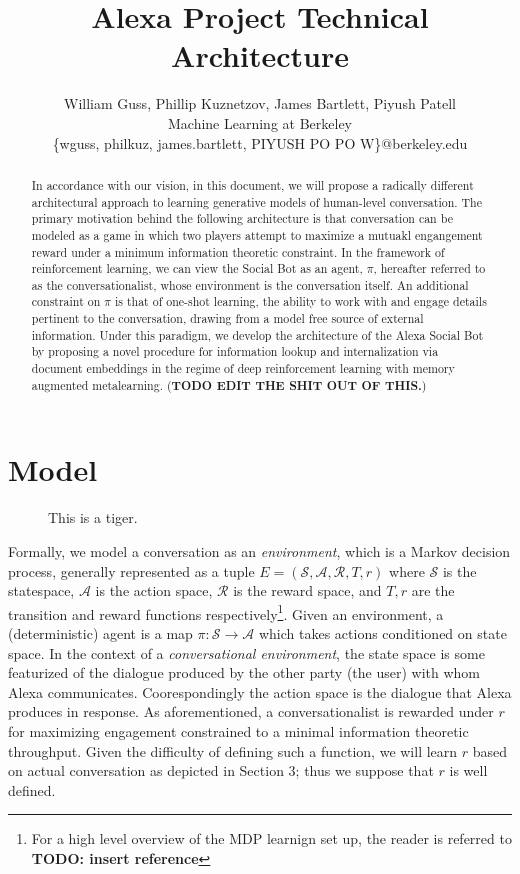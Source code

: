\documentclass{article} %
\title{Alexa Project Technical Architecture}
\author{William Guss, Phillip Kuznetzov, James Bartlett, Piyush Patell\\
Machine Learning at Berkeley\\
\{wguss, philkuz, james.bartlett, PIYUSH PO PO W\}@berkeley.edu}
\numberwithin{equation}{subsection}
\numberwithin{theorem}{subsection}
\theoremstyle{named}
\def\scripta{{\mathcal A}}
\def\scriptr{{\mathcal R}}
\def\scripts{{\mathcal S}}
\begin{document}
\maketitle

\begin{abstract}
In accordance with our vision, in this document, we will propose a radically different architectural approach to learning generative models of human-level conversation. The primary motivation behind the following architecture is that conversation can be modeled as a game in which two players attempt to maximize a mutuakl engangement reward under a minimum information theoretic constraint. In the framework of reinforcement learning, we can view the Social Bot as an agent, $\pi$, hereafter referred to as the conversationalist, whose environment is the conversation itself. An additional constraint on $\pi$ is that of one-shot learning, the ability to work with and engage details pertinent to the conversation, drawing from a model free source of external information. Under this paradigm, we develop the architecture of the Alexa Social Bot by proposing a novel procedure for information lookup and internalization via document embeddings in the regime of deep reinforcement learning with memory augmented metalearning. (\textbf{TODO EDIT THE SHIT OUT OF THIS.})
\end{abstract}

\section{Model}

\begin{figure*}
	
  \caption{This is a tiger.}
\end{figure*}

Formally, we model a conversation as an \emph{environment}, which is a Markov decision process, generally represented as a tuple $E=(\scripts, \scripta, \scriptr, T, r)$ where $\scripts$ is the statespace, $\scripta$ is the action space, $\scriptr$ is the reward space, and $T, r$ are the transition and reward functions respectively\footnote{For a high level overview of the MDP learnign set up, the reader is referred to \textbf{ TODO: insert reference}}. Given an environment, a (deterministic) agent is a map $\pi: \scripts \to \scripta$ which takes actions conditioned on state space. In the context of a \emph{conversational environment}, the state space is some featurized of the dialogue produced by the other party (the user) with whom Alexa communicates. Coorespondingly the action space is the dialogue that Alexa produces in response. As aforementioned, a conversationalist is rewarded under $r$ for maximizing engagement constrained to a minimal information theoretic throughput. Given the difficulty of defining such a function, we will learn $r$ based on actual conversation as depicted in Section 3; thus we suppose that $r$ is well defined.
\end{document}
